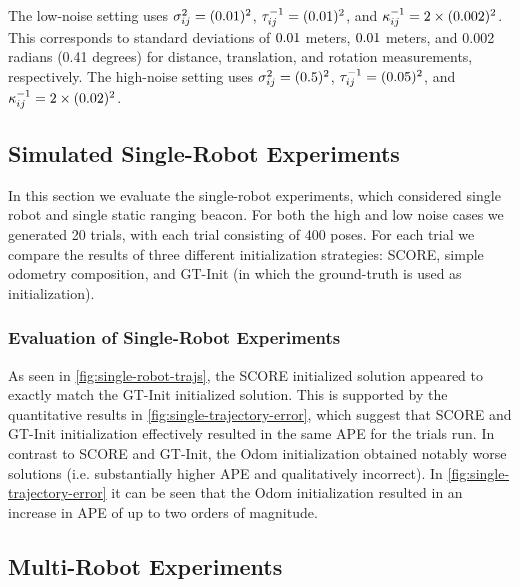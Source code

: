 \SingleRobotTrajectoryFigure
\SingleRobotAPEBoxPlot

The low-noise setting uses $\sigma^{2}_{ij} = (0.01)^2$, $\tau^{-1}_{ij} =
(0.01)^2$, and $\kappa^{-1}_{ij} = 2 \times (0.002)^2$. This corresponds to standard
deviations of $0.01$ meters, $0.01$ meters, and 0.002 radians
(0.41 degrees) for distance, translation, and rotation measurements,
respectively. The high-noise setting uses $\sigma^{2}_{ij} = (0.5)^2$,
$\tau^{-1}_{ij} = (0.05)^2$, and $\kappa^{-1}_{ij} = 2 \times (0.02)^2$.


\subsection{Simulated Single-Robot Experiments}
\label{sec:single-robot-experiments}

In this section we evaluate the single-robot experiments, which considered
single robot and single static ranging beacon. For both the high and low noise
cases we generated 20 trials, with each trial consisting of 400 poses. For each
trial we compare the results of three different initialization strategies:
SCORE, simple odometry composition, and GT-Init (in which the ground-truth is
used as initialization).

\subsubsection{Evaluation of Single-Robot Experiments}

As seen in \cref{fig:single-robot-trajs}, the SCORE initialized solution
appeared to exactly match the GT-Init initialized solution. This is supported by
the quantitative results in \cref{fig:single-trajectory-error}, which suggest
that SCORE and GT-Init initialization effectively resulted in the same APE for
the trials run. In contrast to SCORE and GT-Init, the Odom initialization
obtained notably worse solutions (i.e. substantially higher APE and
qualitatively incorrect).  In \cref{fig:single-trajectory-error} it can be seen
that the Odom initialization resulted in an increase in APE of up to two orders
of magnitude.

\subsection{Multi-Robot Experiments}
\label{sec:multi-robot-experiments}

\MultiRobotTrajectoryFourPanelFigure

